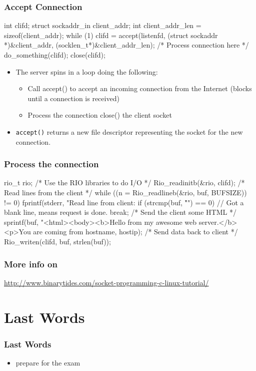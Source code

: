 \documentclass[newPxFont,sthlmFooter,nooffset]{beamer}
\begin{document}
\begin{frame}[t, fragile]
  \frametitle{Accept Connection}
\begin{codedefnb}
int clifd;
struct sockaddr_in client_addr;
int client_addr_len = sizeof(client_addr);
while (1) {
     clifd = accept(listenfd,
     (struct sockaddr *)&client_addr,
                   (socklen_t*)&client_addr_len);
     /* Process connection here */
     do_something(clifd);
     close(clifd); 
}  
\end{codedefnb}
\begin{itemize}
\item The server spins in a loop doing the following:
  \begin{itemize}
  \item Call accept() to accept an incoming connection from the
    Internet (blocks until a connection is received)
  \item Process the connection close() the client socket
  \end{itemize}
\item \texttt{accept()} returns a new file descriptor representing the socket for the new connection.
\end{itemize}
\end{frame}


\begin{frame}[t, fragile]
  \frametitle{Process the connection}
\begin{codedefnb}
rio_t rio; /* Use the RIO libraries to do I/O */
    Rio_readinitb(&rio, clifd);
/* Read lines from the client */
while ((n = Rio_readlineb(&rio, buf, BUFSIZE)) != 0) {
      fprintf(stderr, "Read line from client: %
      if (strcmp(buf, "\r\n") == 0) {
        // Got a blank line, means request is done.
break; }
}
    /* Send the client some HTML */
    sprintf(buf, "<html><body><b>Hello from my awesome web server.</b><p>You are
coming from %
     hostname, hostip);
    /* Send data back to client */
Rio_writen(clifd, buf, strlen(buf));  
\end{codedefnb}
\end{frame}


\begin{frame}[t, fragile]
  \frametitle{More info on}

\url{http://www.binarytides.com/socket-programming-c-linux-tutorial/}
\end{frame}



\section{Last Words}

\begin{frame}[t]
  \frametitle{Last Words}

\begin{itemize}
\item prepare for the exam
\end{itemize}
\end{frame}
\end{document}
